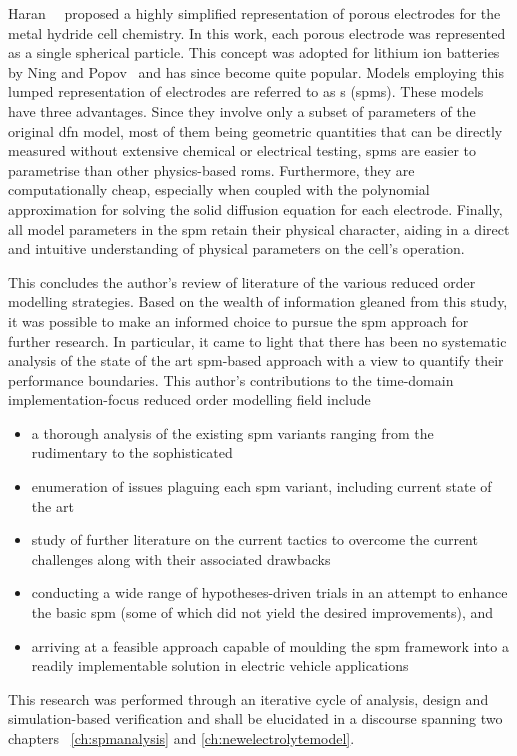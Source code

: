 Haran~\etal{}~\cite{Haran1998}  proposed a  highly simplified  representation of
porous  electrodes for  the metal  hydride cell  chemistry. In  this work,  each
porous electrode  was represented as  a single spherical particle.  This concept
was adopted for lithium ion batteries  by Ning and Popov~\cite{Ning2004} and has
since  become quite  popular.  Models employing  this  lumped representation  of
electrodes are referred to as  s (\gls{spm}s). These models have
three  advantages.  Since they  involve  only  a  subset  of parameters  of  the
original \gls{dfn}  model, most of them  being geometric quantities that  can be
directly measured without extensive  chemical or electrical testing, \glspl{spm}
are  easier to  parametrise than  other physics-based  \glspl{rom}. Furthermore,
they  are computationally  cheap, especially  when coupled  with the  polynomial
approximation  for solving  the  solid diffusion  equation  for each  electrode.
Finally, all model parameters in  the \gls{spm} retain their physical character,
aiding in  a direct and  intuitive understanding  of physical parameters  on the
cell's operation.

This concludes  the author's review of  literature of the various  reduced order
modelling  strategies. Based  on the  wealth  of information  gleaned from  this
study,  it was  possible to  make  an informed  choice to  pursue the  \gls{spm}
approach  for further  research.  In particular,  it came  to  light that  there
has  been  no systematic  analysis  of  the  state  of the  art  \gls{spm}-based
approach with  a view  to quantify their  performance boundaries.  This author's
contributions to  the time-domain  implementation-focus reduced  order modelling
field include
\begin{itemize}[noitemsep,topsep=0pt, before={\vspace*{-0.25\baselineskip}}]
    \item a thorough analysis of the existing \gls{spm} variants ranging from the rudimentary to the sophisticated
    \item enumeration of issues plaguing each \gls{spm} variant, including current state of the art
    \item study of further literature on the current tactics to overcome the current challenges along with their associated drawbacks
    \item conducting a  wide range of hypotheses-driven trials in an attempt to enhance  the basic \gls{spm} (some of which did not yield the desired
        improvements), and
    \item arriving at  a  feasible  approach  capable  of  moulding  the
        \gls{spm}  framework into  a  readily implementable  solution in
        electric vehicle applications
\end{itemize}
This research was  performed through an iterative cycle of  analysis, design and
simulation-based verification  and shall be  elucidated in a  discourse spanning
two chapters \viz~\cref{ch:spmanalysis} and \cref{ch:newelectrolytemodel}.


